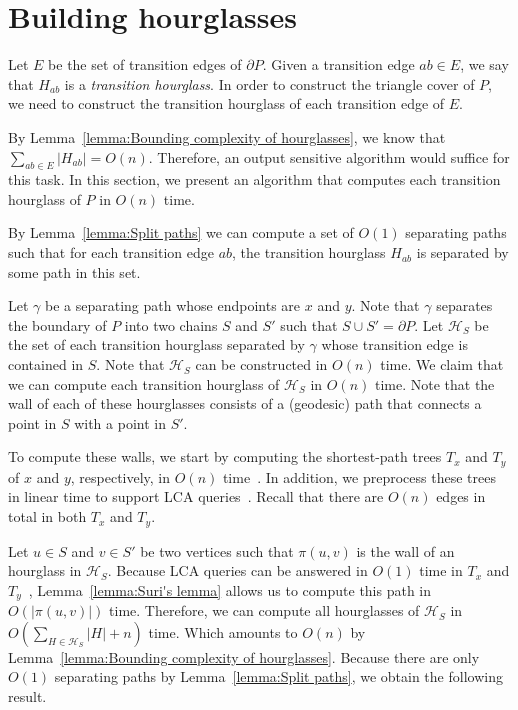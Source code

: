 \documentclass[a4paper,UKenglish]{lipics}
\newcommand{\p}[2]{\ensuremath{\pi(#1, #2)}}
\begin{document}
\section{Building hourglasses}\label{Section: Building hourglasses}

Let $E$ be the set of transition edges of $\partial P$.
Given a transition edge $ab\in E$, we say that $H_{ab}$ is a \emph{transition hourglass}.
In order to construct the triangle cover of $P$, 
we need to construct the transition hourglass of each transition edge of $E$.

By Lemma~\ref{lemma:Bounding complexity of hourglasses}, we know that $\sum_{ab\in E} |H_{ab}| = O(n)$.
Therefore, an output sensitive algorithm would suffice for this task. 
In this section, we present an algorithm that computes each transition hourglass of $P$ in $O(n)$ time.

By Lemma~\ref{lemma:Split paths} we can compute a set of $O(1)$ separating paths such that for each transition edge $ab$, the transition hourglass $H_{ab}$ is separated by some path in this set.

Let $\gamma$ be a separating path whose endpoints are $x$ and $y$. 
Note that $\gamma$ separates the boundary of $P$ into two chains $S$ and $S'$ such that $S\cup S' = \partial P$.
Let $\mathcal H_S$ be the set of each transition hourglass separated by $\gamma$ whose transition edge is contained in $S$.
Note that $\mathcal H_S$ can be constructed in $O(n)$ time.
We claim that we can compute each transition hourglass of $\mathcal H_S$ in $O(n)$ time.
Note that the wall of each of these hourglasses consists of a (geodesic) path that connects a point in $S$ with a point in $S'$.

To compute these walls, we start by computing the shortest-path trees $T_x$ and $T_y$ of $x$ and $y$, respectively, in $O(n)$ time~\cite{guibasShortestPathTree}. 
In addition, we preprocess these trees in linear time to support LCA queries~\cite{harel1984fast}.
Recall that there are $O(n)$ edges in total in both $T_x$ and $T_y$.

Let $u\in S$ and $v\in S'$ be two vertices such that $\p{u}{v}$ is the wall of an hourglass in $\mathcal H_S$.
Because LCA queries can be answered in $O(1)$ time in $T_x$ and $T_y$~\cite{harel1984fast}, 
Lemma~\ref{lemma:Suri's lemma} allows us to compute this path in $O(|\p{u}{v}|)$ time. 
Therefore, we can compute all hourglasses of $\mathcal H_S$ in $O(\sum_{H\in \mathcal H_S} |H| + n)$ time. 
Which amounts to $O(n)$ by Lemma~\ref{lemma:Bounding complexity of hourglasses}. 
Because there are only $O(1)$ separating paths by Lemma~\ref{lemma:Split paths}, we obtain the following result.
\end{document}
